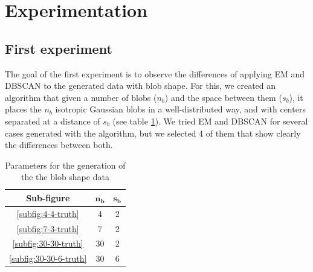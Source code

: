 \section{Experimentation}
\label{sec:experimentation}
\subsection{First experiment}
The goal of the first experiment is to observe the differences of applying EM and DBSCAN to the generated data with blob shape. For this, we created an algorithm that given a number of blobs ($n_b$) and the space between them ($s_b$), it places the $n_b$ isotropic Gaussian blobs in a well-distributed way, and with centers separated at a distance of $s_b$ (see table \ref{tab:data-param}). We tried EM and DBSCAN for several cases generated with the algorithm, but we selected 4 of them that show clearly the differences between both. %
\begin{table}[hbtp]
    \centering
    \begin{tabular}{c c c}
        \toprule
        \textbf{Sub-figure} & $\bm{n_b}$ & $\bm{s_b}$ \\ \midrule
        \ref{subfig:4-4-truth} & 4 & 2 \\
        \ref{subfig:7-3-truth} & 7 & 2 \\
        \ref{subfig:30-30-truth} & 30 & 2 \\
        \ref{subfig:30-30-6-truth} & 30 & 6 \\
        \bottomrule
    \end{tabular}
    \caption{Parameters for the generation of the the blob shape data}
    \label{tab:data-param}
\end{table}

